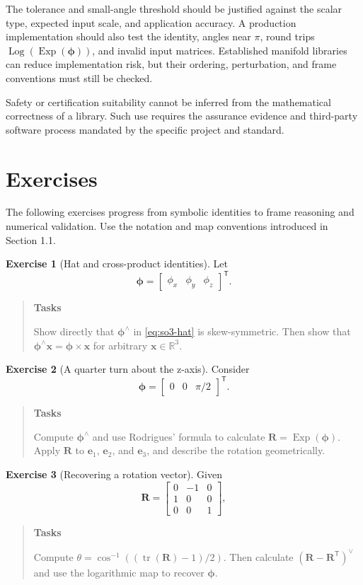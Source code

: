 \documentclass[10pt,a4paper]{article}
\numberwithin{equation}{section}
\newcommand{\Section}[1]{\section{#1}}
\newcommand{\Exp}{\operatorname{Exp}}
\newcommand{\Log}{\operatorname{Log}}
\newcommand{\tr}{\operatorname{tr}}
\newcommand{\vect}[1]{\boldsymbol{#1}}
\theoremstyle{definition}
\theoremstyle{exercisestyle}
\newtheorem{exercise}{Exercise}[section]
\newenvironment{tasks}
    {\par\begin{quote}\small\textbf{Tasks}\par\smallskip}
    {\end{quote}}
\begin{document}
The tolerance and small-angle threshold should be justified against the scalar
type, expected input scale, and application accuracy. A production
implementation should also test the identity, angles near $\pi$, round trips
$\Log(\Exp(\vect{\phi}))$, and invalid input matrices. Established manifold
libraries can reduce implementation risk, but their ordering, perturbation, and
frame conventions must still be checked.

Safety or certification suitability cannot be inferred from the mathematical
correctness of a library. Such use requires the assurance evidence and
third-party software process mandated by the specific project and standard.

\clearpage
\Section{Exercises}

The following exercises progress from symbolic identities to frame reasoning
and numerical validation. Use the notation and map conventions introduced in
Section 1.1.

\begin{exercise}[Hat and cross-product identities]
Let
\[
    \vect{\phi}=\begin{bmatrix}\phi_x&\phi_y&\phi_z\end{bmatrix}^{\mathsf T}.
\]
\begin{tasks}
Show directly that $\vect{\phi}^\wedge$ in \eqref{eq:so3-hat} is
skew-symmetric. Then show that
$\vect{\phi}^\wedge\mathbf{x}=\vect{\phi}\times\mathbf{x}$ for arbitrary
$\mathbf{x}\in\mathbb{R}^3$.
\end{tasks}
\end{exercise}

\begin{exercise}[A quarter turn about the z-axis]
Consider
\[
    \vect{\phi}=\begin{bmatrix}0&0&\pi/2\end{bmatrix}^{\mathsf T}.
\]
\begin{tasks}
Compute $\vect{\phi}^\wedge$ and use Rodrigues' formula to calculate
$\mathbf{R}=\Exp(\vect{\phi})$. Apply $\mathbf{R}$ to
$\mathbf{e}_1$, $\mathbf{e}_2$, and $\mathbf{e}_3$, and describe the rotation
geometrically.
\end{tasks}
\end{exercise}

\begin{exercise}[Recovering a rotation vector]
Given
\[
    \mathbf{R}=\begin{bmatrix}0&-1&0\\1&0&0\\0&0&1\end{bmatrix},
\]
\begin{tasks}
Compute
$\theta={\cos}^{-1}((\tr(\mathbf{R})-1)/2)$. Then calculate
$(\mathbf{R}-\mathbf{R}^{\mathsf T})^\vee$ and use the logarithmic map to
recover $\vect{\phi}$.
\end{tasks}
\end{exercise}
\end{document}
